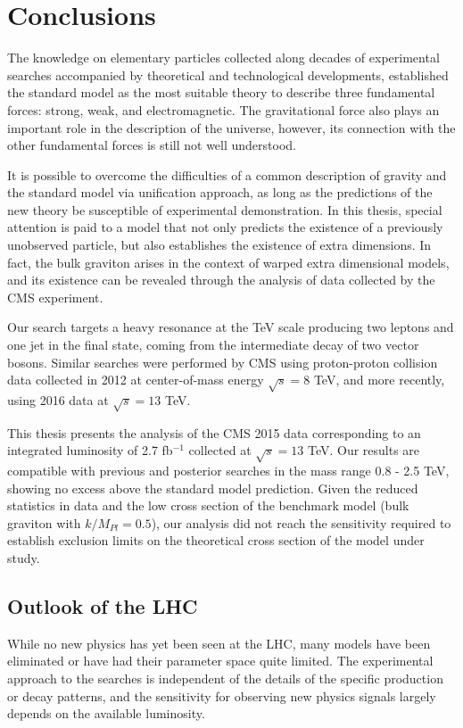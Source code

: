 \chapter{Conclusions}

The knowledge on elementary particles collected along decades of experimental searches accompanied by theoretical and technological developments, established the standard model as the most suitable theory to describe three fundamental forces: strong, weak, and electromagnetic. The gravitational force also plays an important role in the description of the universe, however, its connection with the other fundamental forces is still not well understood.

It is possible to overcome the difficulties of a common description of gravity and the standard model via unification approach, as long as the predictions of the new theory be susceptible of experimental demonstration. In this thesis, special attention is paid to a model that not only predicts the existence of a previously unobserved particle, but also establishes the existence of extra dimensions. In fact, the bulk graviton arises in the context of warped extra dimensional models, and its existence can be revealed through the analysis of data collected by the CMS experiment. 

Our search targets a heavy resonance at the TeV scale producing two leptons and one jet in the final state, coming from the intermediate decay of two vector bosons. Similar searches were performed by CMS using proton-proton collision data collected in 2012 at center-of-mass energy $\sqrt{s} = 8$ TeV, and more recently, using 2016 data at $\sqrt{s}=13$ TeV. 

This thesis presents the analysis of the CMS 2015 data corresponding to an integrated luminosity of 2.7 fb$^{-1}$ collected at $\sqrt{s}=13$ TeV. Our results \cite{CMS-PAS-B2G-16-010} are compatible with previous \cite{Khachatryan:2014gha} and posterior \cite{CMS-PAS-B2G-16-022,CMS-PAS-HIG-16-034} searches in the mass range 0.8 - 2.5 TeV, showing no excess above the standard model prediction. Given the reduced statistics in data and the low cross section of the benchmark model (bulk graviton with $k/M_{Pl}=0.5$), our analysis did not reach the sensitivity required to establish exclusion limits on the theoretical cross section of the model under study.

\section*{Outlook of the LHC}
While no new physics has yet been seen at the LHC, many models have been eliminated or have had their parameter space quite limited. The experimental approach to the searches is independent of the details of the specific production or decay patterns, and the sensitivity for observing new physics signals largely depends on the available luminosity. 

